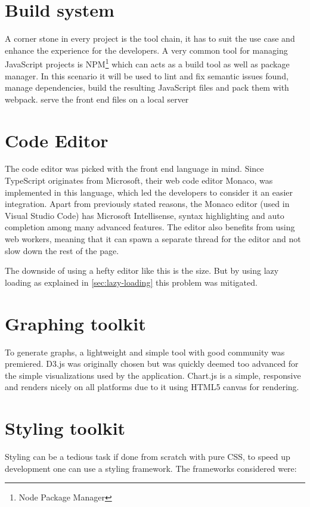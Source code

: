 \documentclass[12pt,a4paper]{report}
\begin{document}
\section{Build system}
A corner stone in every project is the tool chain, it has to suit the use case and enhance the experience for the developers. A very common tool for managing JavaScript projects is NPM\footnote{Node Package Manager} which can acts as a build tool as well as package manager. In this scenario it will be used to lint and fix semantic issues found, manage dependencies, build the resulting JavaScript files and pack them with webpack\cite{webpack}. serve the front end files on a local server 


\section{Code Editor}
The code editor was picked with the front end language in mind. Since TypeScript originates from Microsoft, their web code editor Monaco, was implemented in this language, which led the developers to consider it an easier integration.
Apart from previously stated reasons, the Monaco editor (used in Visual Studio Code) has Microsoft Intellisense, syntax highlighting and auto completion among many advanced features.
The editor also benefits from using web workers, meaning that it can spawn a separate thread for the editor and not slow down the rest of the page.

The downside of using a hefty editor like this is the size. But by using lazy loading as explained in \autoref{sec:lazy-loading} this problem was mitigated.

\section{Graphing toolkit}
To generate graphs, a lightweight and simple tool with good community was premiered. D3.js was originally chosen but was quickly deemed too advanced for the simple visualizations used by the application. Chart.js is a simple, responsive and renders nicely on all platforms due to it using HTML5 canvas for rendering.

\section{Styling toolkit}
Styling can be a tedious task if done from scratch with pure CSS, to speed up development one can use a styling framework.
The frameworks considered were:
\end{document}

